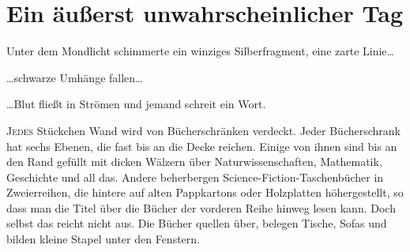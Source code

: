 \chapter[Ein äußerst unwahrscheinlicher Tag]{Ein äußerst unwahrscheinlicher Tag}

\begin{chapterOpeningQuote}
\noindent
Unter dem Mondlicht schimmerte ein winziges Silberfragment, eine zarte Linie…

\vspace*{2ex}
…schwarze Umhänge fallen…

\vspace*{2ex}
…Blut fließt in Strömen und jemand schreit ein Wort.
\end{chapterOpeningQuote}

\lettrine{J}{edes} Stückchen Wand wird von Bücherschränken verdeckt. Jeder Bücherschrank hat sechs Ebenen, die fast bis an die Decke reichen. Einige von ihnen sind bis an den Rand gefüllt mit dicken Wälzern über Naturwissenschaften, Mathematik, Geschichte und all das. Andere beherbergen Science-Fiction-Taschenbücher in Zweierreihen, die hintere auf alten Pappkartons oder Holzplatten höhergestellt, so dass man die Titel über die Bücher der vorderen Reihe hinweg lesen kann. Doch selbst das reicht nicht aus. Die Bücher quellen über, belegen Tische, Sofas und bilden kleine Stapel unter den Fenstern.

